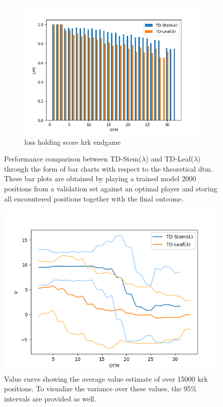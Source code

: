 \begin{figure}
\begin{subfigure}[b]{0.4\textwidth}
\includegraphics[scale=0.5]{fig/plots/krk_lhs}
\caption{loss holding score \gls{krk} endgame}
\end{subfigure}
\caption[Performance comparison between TD-Stem($\lambda$) and TD-Leaf($\lambda$) experiment 1]{Performance comparison between TD-Stem($\lambda$) and TD-Leaf($\lambda$) through the form of bar charts with respect to the theoretical \gls{dtm}. These bar plots are obtained by playing a trained model 2000 positions from a validation set against an optimal player and storing all encountered positions together with the final outcome.}
\label{fig:krk_perf}
\end{figure}

\begin{figure}
\centering
\includegraphics[]{fig/plots/krk_vf}
\caption[value curve experiment 1]{Value curve showing the average value estimate of over 15000 \gls{krk} positions. To visualize the variance over these values, the 95\% intervals are provided as well.}
\label{fig:krk_vf}
\end{figure}

